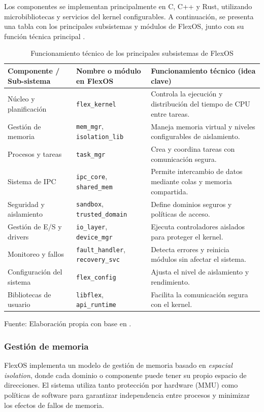 Los componentes se implementan principalmente en C, C++ y Rust, utilizando microbibliotecas y servicios del kernel configurables.  
A continuación, se presenta una tabla con los principales subsistemas y módulos de FlexOS, junto con su función técnica principal \citep{flexos2023paper}.

\begin{table}[H]
\centering
\caption{Funcionamiento técnico de los principales subsistemas de FlexOS}
\begin{tabular}{|p{5cm}|p{4cm}|p{6cm}|}
\hline
\textbf{Componente / Sub-sistema} & \textbf{Nombre o módulo en FlexOS} & \textbf{Funcionamiento técnico (idea clave)} \\ \hline
Núcleo y planificación & \texttt{flex\_kernel} & Controla la ejecución y distribución del tiempo de CPU entre tareas. \\ \hline
Gestión de memoria & \texttt{mem\_mgr}, \texttt{isolation\_lib} & Maneja memoria virtual y niveles configurables de aislamiento. \\ \hline
Procesos y tareas & \texttt{task\_mgr} & Crea y coordina tareas con comunicación segura. \\ \hline
Sistema de IPC & \texttt{ipc\_core}, \texttt{shared\_mem} & Permite intercambio de datos mediante colas y memoria compartida. \\ \hline
Seguridad y aislamiento & \texttt{sandbox}, \texttt{trusted\_domain} & Define dominios seguros y políticas de acceso. \\ \hline
Gestión de E/S y drivers & \texttt{io\_layer}, \texttt{device\_mgr} & Ejecuta controladores aislados para proteger el kernel. \\ \hline
Monitoreo y fallos & \texttt{fault\_handler}, \texttt{recovery\_svc} & Detecta errores y reinicia módulos sin afectar el sistema. \\ \hline
Configuración del sistema & \texttt{flex\_config} & Ajusta el nivel de aislamiento y rendimiento. \\ \hline
Bibliotecas de usuario & \texttt{libflex}, \texttt{api\_runtime} & Facilita la comunicación segura con el kernel. \\ \hline
\end{tabular}
\centering
Fuente: Elaboración propia con base en \citep{flexos2023paper}.
\end{table}


\subsubsection*{Gestión de memoria}
FlexOS implementa un modelo de gestión de memoria basado en \textit{espacial isolation}, donde cada dominio o componente puede tener su propio espacio de direcciones.  
El sistema utiliza tanto protección por hardware (MMU) como políticas de software para garantizar independencia entre procesos y minimizar los efectos de fallos de memoria.


